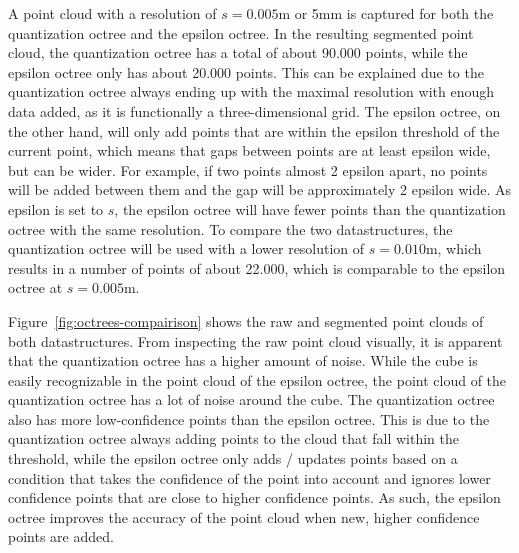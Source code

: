 A point cloud with a resolution of $s=0.005$m or 5mm is captured for both the quantization octree and the epsilon octree.
In the resulting segmented point cloud, the quantization octree has a total of about 90.000 points,
while the epsilon octree only has about 20.000 points.
This can be explained due to the quantization octree always ending up with the maximal resolution
with enough data added, as it is functionally a three-dimensional grid.
The epsilon octree, on the other hand, will only add points that are within the epsilon threshold of the current point,
which means that gaps between points are at least epsilon wide, but can be wider.
For example, if two points almost 2 epsilon apart, no points will be added between them and the gap will be approximately
2 epsilon wide.
As epsilon is set to $s$, the epsilon octree will have fewer points than the quantization octree with the same resolution.
To compare the two datastructures, the quantization octree will be used with a lower resolution of $s=0.010$m,
which results in a number of points of about 22.000, which is comparable to the epsilon octree at $s=0.005$m.

Figure~\ref{fig:octrees-compairison} shows the raw and segmented point clouds of both datastructures.
From inspecting the raw point cloud visually, it is apparent that the quantization octree has a higher amount of noise.
While the cube is easily recognizable in the point cloud of the epsilon octree, the point cloud of the quantization octree has a lot of noise around the cube.
The quantization octree also has more low-confidence points than the epsilon octree.
This is due to the quantization octree always adding points to the cloud that fall within the threshold,
while the epsilon octree only adds / updates points based on a condition that takes the confidence of the point into account
and ignores lower confidence points that are close to higher confidence points.
As such, the epsilon octree improves the accuracy of the point cloud when new, higher confidence points are added.


